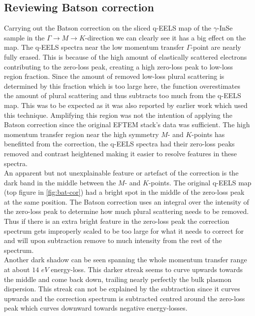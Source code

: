 \begin{multicols}{2}
	\subsection{Reviewing Batson correction}
	Carrying out the Batson correction on the sliced q-EELS map of the $\gamma$-InSe sample in the $\Gamma \rightarrow M \rightarrow K$-direction we can clearly see it has a big effect on the map. The q-EELS spectra near the low momentum transfer $\Gamma$-point are nearly fully erased. This is because of the high amount of elastically scattered electrons contributing to the zero-loss peak, creating a high zero-loss peak to low-loss region fraction. Since the amount of removed low-loss plural scattering is determined by this fraction which is too large here, the function overestimates the amount of plural scattering and thus subtracts too much from the q-EELS map. This was to be expected as it was also reported by earlier work which used this technique.\cite{Schneider:191230} Amplifying this region was not the intention of applying the Batson correction since the original EFTEM stack's data was sufficient. The high momentum transfer region near the high symmetry $M$- and $K$-points has benefitted from the correction, the q-EELS spectra had their zero-loss peaks removed and contrast heightened making it easier to resolve features in these spectra.\\
	An apparent but not unexplainable feature or artefact of the correction is the dark band in the middle between the $M$- and $K$-points. The original q-EELS map (top figure in \ref{fig:bat-cor}) had a bright spot in the middle of the zero-loss peak at the same position. The Batson correction uses an integral over the intensity of the zero-loss peak to determine how much plural scattering needs to be removed. Thus if there is an extra bright feature in the zero-loss peak the correction spectrum gets improperly scaled to be too large for what it needs to correct for and will upon subtraction remove to much intensity from the rest of the spectrum.\\
	Another dark shadow can be seen spanning the whole momentum transfer range at about $14$ $eV$ energy-loss. This darker streak seems to curve upwards towards the middle and come back down, trailing nearly perfectly the bulk plasmon dispersion. This streak can not be explained by the subtraction since it curves upwards and the correction spectrum is subtracted centred around the zero-loss peak which curves downward towards negative energy-losses.\\

\end{multicols}
